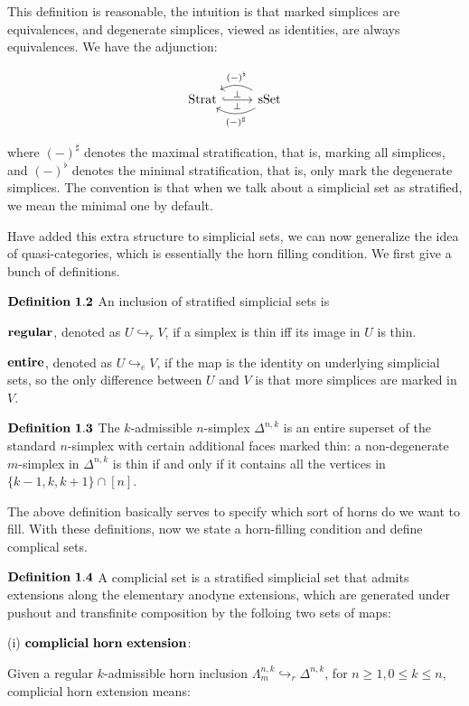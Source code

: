 \documentclass[11pt]{article}
\DeclareMathOperator{\Strat}{Strat}
\DeclareMathOperator{\sSet}{sSet}
\begin{document}
This definition is reasonable, the intuition is that marked simplices are equivalences, and degenerate simplices, viewed as identities, are always equivalences. We have the adjunction:


$$
\begin{tikzcd}
\Strat \arrow[r, hook, "\perp", "\perp" swap] & \sSet \arrow[l, bend left, "(-)^\sharp"] \arrow[l, bend right, "(-)^\flat" swap]
\end{tikzcd}
$$

where $(-)^\sharp$ denotes the maximal stratification, that is, marking all simplices, and $(-)^\flat$ denotes the minimal stratification, that is, only mark the degenerate simplices. The convention is that when we talk about a simplicial set as stratified, we mean the minimal one by default.

Have added this extra structure to simplicial sets, we can now generalize the idea of quasi-categories, which is essentially the horn filling condition. We first give a bunch of definitions. 

$\bf Definition \ 1.2$ An inclusion of stratified simplicial sets is 

$\bf regular$, denoted as $U\hookrightarrow_r V$, if a simplex is thin iff its image in $U$ is thin. 


$\bf entire$, denoted as $U\hookrightarrow_e V$, if the map is the identity on underlying simplicial
sets, so the only difference between $U$ and $V$ is that more
simplices are marked in $V$.


$\bf Definition \ 1.3$ The $k$-admissible $n$-simplex $\Delta^{n,k}$ is an
entire superset of the standard $n$-simplex with certain additional faces marked thin:
a non-degenerate $m$-simplex in $\Delta^{n,k}$ is thin if and only if it contains all the vertices in $\{k- 1, k, k + 1\} \cap [n]$. 

The above definition basically serves to specify which sort of horns do we want to fill. With these definitions, now we state a horn-filling condition and define complical sets.

$\bf Definition \ 1.4$ A complicial set is a stratified simplicial set that admits extensions along the elementary anodyne extensions, which are generated under pushout and transfinite composition by the folloing two sets of maps:

(i) $\bf complicial \ horn \ extension$:

Given a regular $k$-admissible horn inclusion $\Lambda^{n,k}_m\hookrightarrow_r \Delta^{n,k}$, for $n\ge 1,0\le k\le n$, complicial horn extension means:
\end{document}
